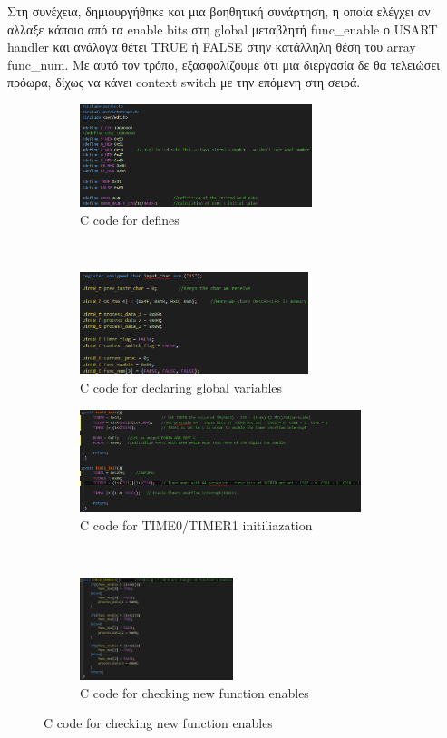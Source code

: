 \documentclass{article}
\begin{document}
	\noindent
	Στη συνέχεια, δημιουργήθηκε και μια βοηθητική συνάρτηση, η οποία ελέγχει αν αλλαξε κάποιο από τα enable bits στη global μεταβλητή func\_enable ο USART handler και ανάλογα θέτει TRUE ή FALSE στην κατάλληλη θέση του array func\_num. Mε αυτό τον τρόπο, εξασφαλίζουμε ότι μια διεργασία δε θα τελειώσει πρόωρα, δίχως να κάνει context switch με την επόμενη στη σειρά.
	 
	\pagebreak
	\begin{figure}[h!]
		\centering
		\begin{subfigure}[t]{0.5\textwidth}
			\centering
			\includegraphics[height=3cm, width=\linewidth]{./results/lab8_defines.png}
			\caption{C code for defines}
		\end{subfigure}%
		~
		\begin{subfigure}[t]{0.5\textwidth}
			\centering
			\includegraphics[height=3cm, width=\linewidth]{./results/lab8_global_variables.png}
			\caption{C code for declaring global variables}
		\end{subfigure}
		
		\begin{subfigure}[t]{0.5\textwidth}
			\centering
			\includegraphics[height=3cm, width=\linewidth]{./results/lab8_timers.png}
			\caption{C code for TIME0/TIMER1 initiliazation}
		\end{subfigure}%
		~
		\begin{subfigure}[t]{0.5\textwidth}
			\centering
			\includegraphics[height=3cm, width=\linewidth]{./results/lab8_enables.png}
			\caption{C code for checking new function enables}
		\end{subfigure}	
	\end{figure}
	
\end{document}
